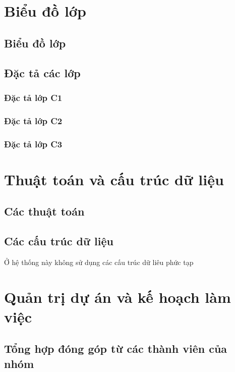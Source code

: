 \documentclass[a4paper, 12pt]{article}
\begin{document}
	\clearpage
	
	\section{Biểu đồ lớp}
	
	\subsection{Biểu đồ lớp}
	
	\subsection{Đặc tả các lớp}
	
	\subsubsection{Đặc tả lớp C1}
	
	\subsubsection{Đặc tả lớp C2}
	
	\subsubsection{Đặc tả lớp C3}
	
	\clearpage
	
	\section{Thuật toán và cấu trúc dữ liệu}
	
	\subsection{Các thuật toán}
	
	\subsection{Các cấu trúc dữ liệu}
	Ở hệ thống này không sử dụng các cấu trúc dữ liêu phức tạp
	
	
	\clearpage
	
	\section{Quản trị dự án và kế hoạch làm việc}
	
	\subsection{Tổng hợp đóng góp từ các thành viên của nhóm}
	
\end{document}
